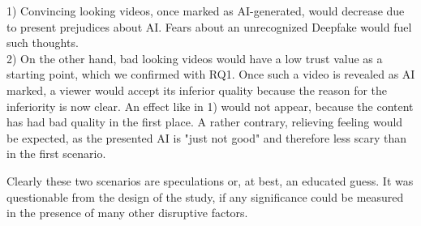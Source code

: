 \documentclass[
  a4paper,  %
  twoside,  %
  bibliography=totoc,
  headsepline,
  cleardoublepage=empty,
  parskip=half,
  draft=false
]{scrbook}
\begin{document}
1) Convincing looking videos, once marked as AI-generated, would decrease due to present prejudices about AI. Fears about an unrecognized Deepfake would fuel such thoughts. \\
2) On the other hand, bad looking videos would have a low trust value as a starting point, which we confirmed with RQ1. Once such a video is revealed as AI marked, a viewer would accept its inferior quality because the reason for the inferiority is now clear. An effect like in 1) would not appear, because the content has had bad quality in the first place. A rather contrary, relieving feeling would be expected, as the presented AI is "just not good" and therefore less scary than in the first scenario.

Clearly these two scenarios are speculations or, at best, an educated guess. It was questionable from the design of the study, if any significance could be measured in the presence of many other disruptive factors.
\end{document}
